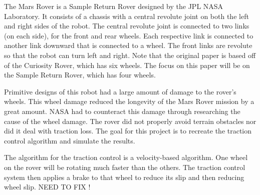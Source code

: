 The Mars Rover is a Sample Return Rover designed by the JPL NASA Laboratory. It consists of a chassis with a central revolute joint on both the left and right sides of the robot. The central revolute joint is connected to two links (on each side),  for the front and rear wheels. Each respective link is connected to another link downward that is connected to a wheel. The front links are revolute so that the robot can turn left and right. Note that the original paper is based off of the Curiosity Rover, which has six wheels. The focus on this paper will be on the Sample Return Rover, which has four wheels. 

Primitive designs of this robot had a large amount of damage to the rover’s wheels. This wheel damage reduced the longevity of the Mars Rover mission by a great amount. NASA had to counteract this damage through researching the cause of the wheel damage. The rover did not properly avoid terrain obstacles nor did it deal with traction loss. The goal for this project is to recreate the traction control algorithm and simulate the results. 

The algorithm for the traction control is a velocity-based algorithm. One wheel on the rover will be rotating much faster than the others. The traction control system then applies a brake to that wheel to reduce its slip and then reducing wheel slip.
NEED TO FIX !